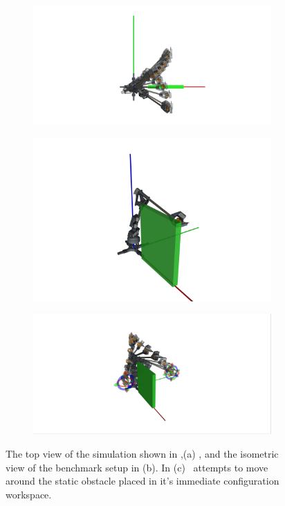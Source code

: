 \begin{figure}
  \centering
  \captionsetup{justification=centering}
  \begin{subfigure}[t]{0.75\linewidth}
    \label{subfig:top_view}
    \includegraphics[width=\linewidth]{benchmark_simulation_top.png}
     \caption{}
  \end{subfigure}
  \begin{subfigure}[t]{0.75\linewidth}
    \includegraphics[width=\linewidth]{benchmark_simulation_iso2.png}
    \caption{}
  \end{subfigure}
  \begin{subfigure}[t]{0.75\linewidth}
    \includegraphics[width=\linewidth]{benchmark_avoiding_obs.png}
    \caption{}
  \end{subfigure}
  \caption{The top view of the simulation shown in ,(a) , 
  and the isometric view of the benchmark setup in (b).
  In (c) \rimini \ attempts to move
     around the static obstacle placed in it's immediate configuration workspace.}
  \label{fig:benchmark_simulation}
\end{figure}
